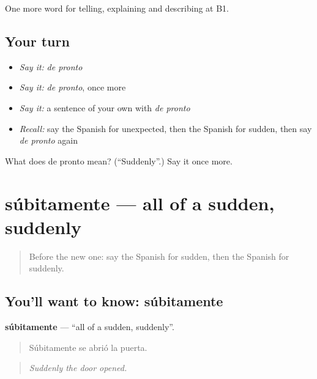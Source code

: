 \begin{grammarlens}[title={What you've built}]
One more word for telling, explaining and describing at B1.
\end{grammarlens}

\subsection*{Your turn}
\begin{itemize}
\raggedright
  \item \emph{Say it:} \emph{de pronto}
  \item \emph{Say it:} \emph{de pronto}, once more
  \item \emph{Say it:} a sentence of your own with \emph{de pronto}
  \item \emph{Recall:} say the Spanish for unexpected, then the Spanish for sudden, then say \emph{de pronto} again
\end{itemize}

\begin{tcolorbox}[breakable,colback=teal!4,colframe=teal!35!black,title={Before you move on}]
What does de pronto mean? (\textquotedblleft{}Suddenly\textquotedblright{}.) Say it once more.
\end{tcolorbox}
\section[súbitamente]{súbitamente — all of a sudden, suddenly}

\label{lesson:ES-C534-subitamente}



\begin{quote}
Before the new one: say the Spanish for sudden, then the Spanish for suddenly.
\end{quote}

\subsection*{You'll want to know: súbitamente}
\textbf{súbitamente} — \textquotedblleft{}all of a sudden, suddenly\textquotedblright{}.

\begin{quote}
Súbitamente se abrió la puerta.
\end{quote}

\begin{quote}
\emph{Suddenly the door opened.}
\end{quote}

